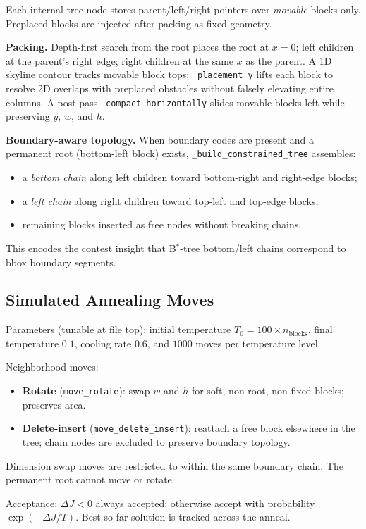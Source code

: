 \documentclass[11pt]{article}
\begin{document}
Each internal tree node stores parent/left/right pointers over \emph{movable} blocks only. Preplaced blocks are injected after packing as fixed geometry.

\textbf{Packing.} Depth-first search from the root places the root at $x{=}0$; left children at the parent's right edge; right children at the same $x$ as the parent. A 1D skyline contour tracks movable block tops; \texttt{\_placement\_y} lifts each block to resolve 2D overlaps with preplaced obstacles without falsely elevating entire columns. A post-pass \texttt{\_compact\_horizontally} slides movable blocks left while preserving $y$, $w$, and $h$.

\textbf{Boundary-aware topology.} When boundary codes are present and a permanent root (bottom-left block) exists, \texttt{\_build\_constrained\_tree} assembles:
\begin{itemize}
    \item a \emph{bottom chain} along left children toward bottom-right and right-edge blocks;
    \item a \emph{left chain} along right children toward top-left and top-edge blocks;
    \item remaining blocks inserted as free nodes without breaking chains.
\end{itemize}
This encodes the contest insight that B$^*$-tree bottom/left chains correspond to bbox boundary segments.

\subsection{Simulated Annealing Moves}

Parameters (tunable at file top): initial temperature $T_0 = 100 \times n_{\text{blocks}}$, final temperature $0.1$, cooling rate $0.6$, and $1000$ moves per temperature level.

Neighborhood moves:
\begin{itemize}
    \item \textbf{Rotate} (\texttt{move\_rotate}): swap $w$ and $h$ for soft, non-root, non-fixed blocks; preserves area.
    \item \textbf{Delete-insert} (\texttt{move\_delete\_insert}): reattach a free block elsewhere in the tree; chain nodes are excluded to preserve boundary topology.
\end{itemize}
Dimension swap moves are restricted to within the same boundary chain. The permanent root cannot move or rotate.

Acceptance: $\Delta J < 0$ always accepted; otherwise accept with probability $\exp(-\Delta J / T)$. Best-so-far solution is tracked across the anneal.
\end{document}
